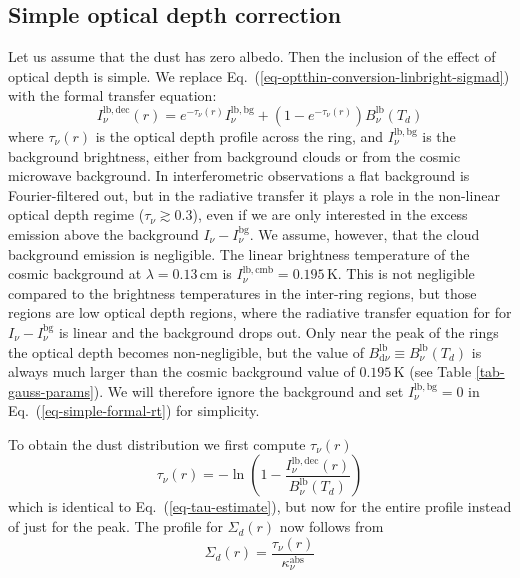 \documentclass{aa}
\begin{document}
\subsection{Simple optical depth correction}
Let us assume that the dust has zero albedo. Then the inclusion of the effect of
optical depth is simple. We replace
Eq.~(\ref{eq-optthin-conversion-linbright-sigmad}) with the formal transfer
equation:
\begin{equation}\label{eq-simple-formal-rt}
  I_\nu^{\mathrm{lb,dec}}(r) = e^{-\tau_\nu(r)}I_\nu^{\mathrm{lb,bg}} +
  \left(1-e^{-\tau_\nu(r)}\right)B_\nu^{\mathrm{lb}}(T_d)
\end{equation}
where $\tau_\nu(r)$ is the optical depth profile across the ring, and
$I_\nu^{\mathrm{lb,bg}}$ is the background brightness, either from background
clouds or from the cosmic microwave background. In interferometric observations
a flat background is Fourier-filtered out, but in the radiative transfer it
plays a role in the non-linear optical depth regime ($\tau_\nu\gtrsim 0.3$),
even if we are only interested in the excess emission above the background
$I_\nu-I_\nu^{\mathrm{bg}}$. We assume, however, that the cloud background
emission is negligible. The linear brightness temperature of the cosmic
background at $\lambda=0.13\,\mathrm{cm}$ is
$I_\nu^{\mathrm{lb,cmb}}=0.195\,\mathrm{K}$. This is not negligible compared to
the brightness temperatures in the inter-ring regions, but those regions are low
optical depth regions, where the radiative transfer equation for for
$I_\nu-I_\nu^{\mathrm{bg}}$ is linear and the background drops out. Only near
the peak of the rings the optical depth becomes non-negligible, but the value of
$B_{\mathrm{d}\nu}^{\mathrm{lb}}\equiv B_\nu^{\mathrm{lb}}(T_d)$ is always much
larger than the cosmic background value of $0.195\,\mathrm{K}$ (see Table
\ref{tab-gauss-params}). We will therefore ignore the background and set
$I_\nu^{\mathrm{lb,bg}}=0$ in Eq.~(\ref{eq-simple-formal-rt}) for simplicity.

To obtain the dust distribution we first compute $\tau_\nu(r)$
\begin{equation}\label{eq-tau-profile}
\tau_\nu(r) = -\ln\left(1-\frac{I_\nu^{\mathrm{lb,dec}}(r)}{B_\nu^{\mathrm{lb}}(T_d)}\right)
\end{equation}
which is identical to Eq.~(\ref{eq-tau-estimate}), but now for the entire
profile instead of just for the peak. The profile for $\Sigma_d(r)$ now follows
from
\begin{equation}
\Sigma_d(r) = \frac{\tau_\nu(r)}{\kappa_\nu^{\mathrm{abs}}}
\end{equation}
\end{document}
